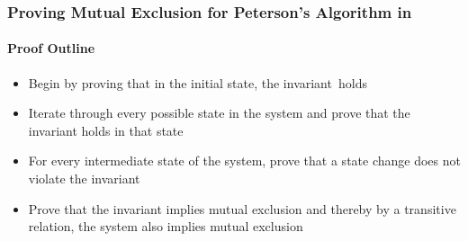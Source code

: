 \documentclass[xcolor=dvipsnames]{beamer}
\begin{document}
\begin{frame}
	\frametitle{Proving Mutual Exclusion for Peterson's Algorithm in \tla}
	\framesubtitle{Proof Outline}
	\begin{itemize}
		\item Begin by proving that in the initial state, the invariant\footnotemark\   holds
		\item Iterate through every possible state in the system and prove that the invariant holds in that state
		\item For every intermediate state of the system, prove that a state change does not violate the invariant
		\item Prove that the invariant implies mutual exclusion and thereby by a transitive relation, the system also implies mutual exclusion
	\end{itemize}

\end{frame}
\end{document}
